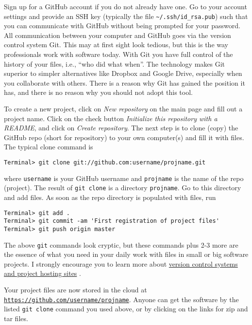 \documentclass[graybox,sectrefs,envcountresetchap,open=right,final]{svmonodo}
\begin{document}
Sign up for a GitHub account if you do not already have one.
Go to your account settings and provide an SSH key (typically
the file \Verb!~/.ssh/id_rsa.pub!) such that
you can communicate with GitHub without being prompted for your password.
All communication between your computer and GitHub goes via the version
control system Git. This may at first sight look tedious, but
this is the way professionals work with software today. With Git you
have full control of the history of your files, i.e., ``who did what when''.
The technology makes Git superior to simpler alternatives
like Dropbox and Google Drive,
especially when you collaborate with others.
There is a reason why Git has gained the position it has,
and there is no reason why you should not adopt this tool.

To create a new project, click on \emph{New repository} on the main page and
fill out a project name. Click on the check button \emph{Initialize this
repository with a README}, and click on \emph{Create repository}. The next
step is to clone (copy) the GitHub repo (short for repository) to
your own computer(s) and fill it with files. The typical clone command is

\begin{Verbatim}[frame=lines,label=\fbox{{\tiny Terminal}},framesep=2.5mm,framerule=0.7pt,fontsize=\fontsize{9pt}{9pt}]
Terminal> git clone git://github.com:username/projname.git
\end{Verbatim}
where \texttt{username} is your GitHub username and \texttt{projname} is the
name of the repo (project). The result of \texttt{git clone} is a
directory \texttt{projname}. Go to this directory and add files.
As soon as the repo directory is populated with files, run

\begin{Verbatim}[frame=lines,label=\fbox{{\tiny Terminal}},framesep=2.5mm,framerule=0.7pt,fontsize=\fontsize{9pt}{9pt}]
Terminal> git add .
Terminal> git commit -am 'First registration of project files'
Terminal> git push origin master
\end{Verbatim}
The above \texttt{git} commands look cryptic, but these commands plus
2-3 more are the essence of what you need in your daily work with
files in small or big
software projects. I strongly encourage you to
learn more about \href{{http://hplgit.github.io/teamods/bitgit/html/}}{version control systems and project hosting
sites}
\cite{Langtangen_bitgit}.

Your project files are now stored in the cloud at
\href{{https://github.com/username/projname}}{\nolinkurl{https://github.com/username/projname}}. Anyone can
get the software by the listed \texttt{git clone} command you used above,
or by clicking on the links for zip and tar files.
\end{document}
